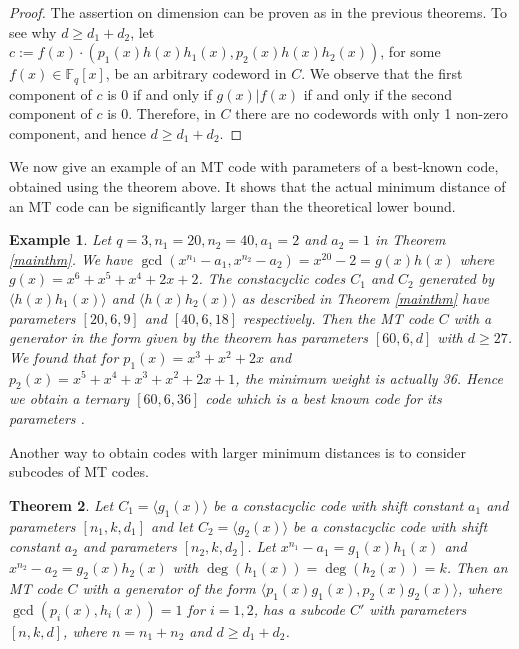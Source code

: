 \documentclass[preprint,12pt]{elsarticle}
\newtheorem{Theorem}{Theorem}[section]
\newtheorem{Example}[Theorem]{Example}
\newcommand{\Fq}{\mathbb{F}_q}
\begin{document}
\begin{proof}
The assertion on dimension can be proven as in the previous theorems. To see why $d\geq d_1+d_2$, let $c:=f(x)\cdot(p_1(x)h(x)h_1(x),p_2(x)h(x)h_2(x))$, for some $f(x)\in\Fq[x]$, be an arbitrary codeword in $C$. We observe that the first component of $c$ is 0 if and only if $g(x)|f(x)$ if and only if the second component of $c$ is 0. Therefore, in $C$ there are no codewords with only 1 non-zero component, and hence $d\geq d_1+d_2$.
\end{proof}

We now give an example of an MT code with parameters of a best-known code, obtained using the theorem above. It shows that the actual minimum distance of an MT code can be significantly larger than the theoretical lower bound. 

\begin{Example}
Let $q=3, n_1=20, n_2=40, a_1=2$ and $a_2=1$ in Theorem \ref{mainthm}. We have 
$\gcd(x^{n_1}-a_1,x^{n_2}-a_2 )= x^{20}-2=g(x)h(x)$ where $g(x)=x^6 + x^5 + x^4 + 2x + 2$. The constacyclic codes $C_1$ and $C_2$ generated by $\langle h(x)h_1(x) \rangle$ and $\langle h(x)h_2(x) \rangle$ as described in Theorem \ref{mainthm}  have parameters $[20, 6, 9]$ and $[40, 6, 18]$ respectively. Then the MT code $C$ with a generator in the form given by the theorem has parameters $[60,6,d]$ with $d\geq 27$. We found that for  $p_1(x)=x^3 + x^2 + 2x$ and
$p_2(x)=x^5 + x^4 + x^3 + x^2 + 2x + 1$, the minimum weight is actually 36. Hence we obtain a ternary $[60,6,36]$ code which is a best known code for its parameters \cite{table}.  
\end{Example}

Another way to obtain codes with larger minimum distances is to consider subcodes of MT codes.

\begin{Theorem}\label{mainthm2}
Let $C_1=\langle g_1(x)\rangle$ be a constacyclic code with shift constant $a_1$ and parameters $[n_1,k,d_1]$ and let $C_2=\langle g_2(x)\rangle$ be a constacyclic code with shift constant $a_2$ and parameters $[n_2,k,d_2]$. Let $x^{n_1}-a_1=g_1(x)h_1(x)$ and $x^{n_2}-a_2=g_2(x)h_2(x)$ with $\deg(h_1(x))=\deg(h_2(x))=k$. Then an MT code $C$ with a generator of the form $\langle p_1(x)g_1(x),p_2(x)g_2(x)\rangle$, where $\gcd(p_i(x),h_i(x))=1$ for $i=1,2$, has a subcode $C'$ with parameters $[n,k,d]$, where $n=n_1+n_2$ and $d\geq d_1+d_2$. 
\end{Theorem}
\end{document}
